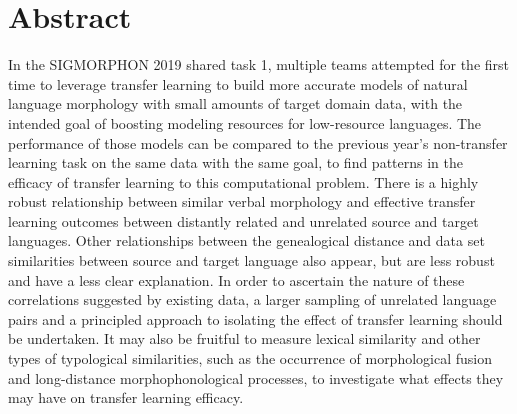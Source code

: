 %
\chapter*{Abstract}
\label{sec:abstract}
\vspace*{-10mm}

In the SIGMORPHON 2019 shared task 1, multiple teams attempted for the first time to leverage transfer learning to build more accurate models of natural language morphology with small amounts of target domain data, with the intended goal of boosting modeling resources for low-resource languages. The performance of those models can be compared to the previous year's non-transfer learning task on the same data with the same goal, to find patterns in the efficacy of transfer learning to this computational problem. There is a highly robust relationship between similar verbal morphology and effective transfer learning outcomes between distantly related and unrelated source and target languages. Other relationships between the genealogical distance and data set similarities between source and target language also appear, but are less robust and have a less clear explanation. In order to ascertain the nature of these correlations suggested by existing data, a larger sampling of unrelated language pairs and a principled approach to isolating the effect of transfer learning should be undertaken. It may also be fruitful to measure lexical similarity and other types of typological similarities, such as the occurrence of morphological fusion and long-distance morphophonological processes, to investigate what effects they may have on transfer learning efficacy.